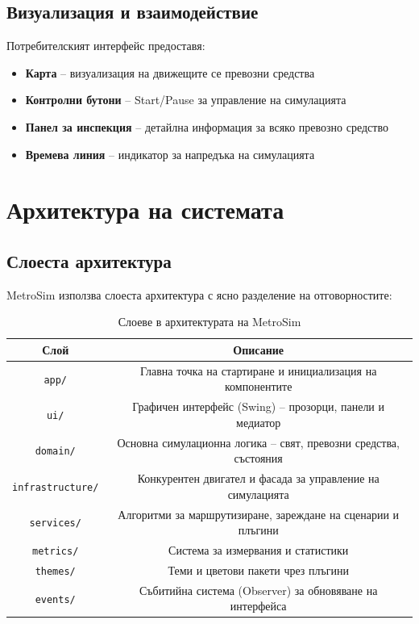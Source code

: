 \documentclass{article}
\begin{document}
	\subsection{Визуализация и взаимодействие}
	
	Потребителският интерфейс предоставя:
	
	\begin{itemize}
		\item \textbf{Карта} – визуализация на движещите се превозни средства
		\item \textbf{Контролни бутони} – Start/Pause за управление на симулацията
		\item \textbf{Панел за инспекция} – детайлна информация за всяко превозно средство
		\item \textbf{Времева линия} – индикатор за напредъка на симулацията
	\end{itemize}
	
	\section{Архитектура на системата}
	
	\subsection{Слоеста архитектура}
	
	MetroSim използва слоеста архитектура с ясно разделение на отговорностите:
	
	\begin{table}[H]
		\centering
		\begin{tabular}{|c|c|}
			\hline
			\textbf{Слой} & \textbf{Описание} \\
			\hline
			\texttt{app/} & Главна точка на стартиране и инициализация на компонентите \\
			\hline
			\texttt{ui/} & Графичен интерфейс (Swing) – прозорци, панели и медиатор \\
			\hline
			\texttt{domain/} & Основна симулационна логика – свят, превозни средства, състояния \\
			\hline
			\texttt{infrastructure/} & Конкурентен двигател и фасада за управление на симулацията \\
			\hline
			\texttt{services/} & Алгоритми за маршрутизиране, зареждане на сценарии и плъгини \\
			\hline
			\texttt{metrics/} & Система за измервания и статистики \\
			\hline
			\texttt{themes/} & Теми и цветови пакети чрез плъгини \\
			\hline
			\texttt{events/} & Събитийна система (Observer) за обновяване на интерфейса \\
			\hline
		\end{tabular}
		\caption{Слоеве в архитектурата на MetroSim}
	\end{table}
	
\end{document}
